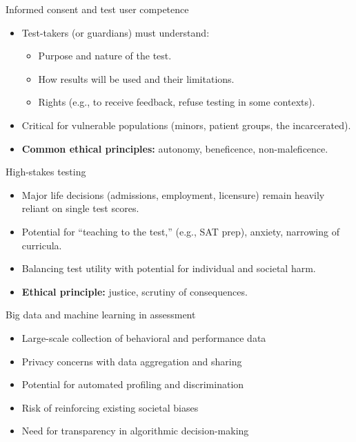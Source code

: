 \documentclass[aspectratio=169]{beamer}
\begin{document}
\begin{frame}{Informed consent and test user competence}
  \begin{itemize}
    \item Test-takers (or guardians) must understand:\pause
    \begin{itemize}
        \item Purpose and nature of the test.\pause
        \item How results will be used and their limitations.\pause
        \item Rights (e.g., to receive feedback, refuse testing in some contexts).\pause
    \end{itemize}
    \item Critical for vulnerable populations (minors, patient groups, the incarcerated).\pause
    \item \textbf{Common ethical principles:} autonomy, beneficence, non-maleficence.
  \end{itemize}
\end{frame}

\begin{frame}{High-stakes testing}
  \begin{itemize}
    \item Major life decisions (admissions, employment, licensure) remain heavily reliant on single test scores.\pause
    \item Potential for ``teaching to the test,'' (e.g., SAT prep), anxiety, narrowing of curricula.\pause
    \item Balancing test utility with potential for individual and societal harm.\pause
    \item \textbf{Ethical principle:} justice, scrutiny of consequences.
  \end{itemize}
\end{frame}

\begin{frame}{Big data and machine learning in assessment}
  \begin{itemize}
    \item Large-scale collection of behavioral and performance data\pause
    \item Privacy concerns with data aggregation and sharing\pause
    \item Potential for automated profiling and discrimination\pause
    \item Risk of reinforcing existing societal biases\pause
    \item Need for transparency in algorithmic decision-making
  \end{itemize}
\end{frame}
\end{document}
